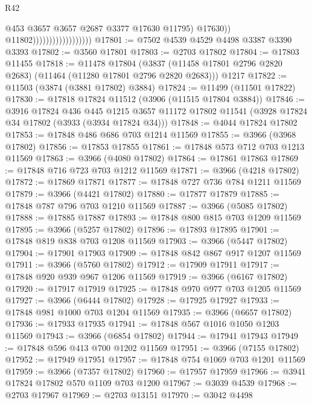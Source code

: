 \begin{lexlean}{R42}
\begin{coremodule}
                                              @453
                                              @3657
                                              @3657
                                              @2687
                                              @3377
                                              @17630
                                              @11795)
                                            @17630))
                                        @11802))))))))))))))))))
@17801 := @7502 @4539 @4529 @4498 @3387 @3390 @3393
@17802 := @3560 @17801
@17803 := @2703 @17802
@17804 := @17803 @11455
@17818 := @11478
    @17804
    (@3837 (@11458 @17801 @2796 @2820 @2683) (@11464 (@11280 @17801 @2796 @2820 @2683)))
    @1217
@17822 := @11503 (@3874 (@3881 @17802) @3884)
@17824 := @11499 (@11501 @17822)
@17830 := @17818 @17824 @11512 (@3906 (@11515 @17804 @3884))
@17846 := @3916
    @17824
    @436
    @445
    @1215
    @3657
    @11172
    @17802
    @11541
    (@3928 @17824 @34 @17802 (@3933 (@3934 @17824 @34)))
@17848 := @4044 @17824 @17802
@17853 := @17848 @486 @686 @703 @1214 @11569
@17855 := @3966 (@3968 @17802)
@17856 := @17853 @17855
@17861 := @17848 @573 @712 @703 @1213 @11569
@17863 := @3966 (@4080 @17802)
@17864 := @17861 @17863
@17869 := @17848 @716 @723 @703 @1212 @11569
@17871 := @3966 (@4218 @17802)
@17872 := @17869 @17871
@17877 := @17848 @727 @736 @784 @1211 @11569
@17879 := @3966 (@4421 @17802)
@17880 := @17877 @17879
@17885 := @17848 @787 @796 @703 @1210 @11569
@17887 := @3966 (@5085 @17802)
@17888 := @17885 @17887
@17893 := @17848 @800 @815 @703 @1209 @11569
@17895 := @3966 (@5257 @17802)
@17896 := @17893 @17895
@17901 := @17848 @819 @838 @703 @1208 @11569
@17903 := @3966 (@5447 @17802)
@17904 := @17901 @17903
@17909 := @17848 @842 @867 @917 @1207 @11569
@17911 := @3966 (@5760 @17802)
@17912 := @17909 @17911
@17917 := @17848 @920 @939 @967 @1206 @11569
@17919 := @3966 (@6167 @17802)
@17920 := @17917 @17919
@17925 := @17848 @970 @977 @703 @1205 @11569
@17927 := @3966 (@6444 @17802)
@17928 := @17925 @17927
@17933 := @17848 @981 @1000 @703 @1204 @11569
@17935 := @3966 (@6657 @17802)
@17936 := @17933 @17935
@17941 := @17848 @567 @1016 @1050 @1203 @11569
@17943 := @3966 (@6854 @17802)
@17944 := @17941 @17943
@17949 := @17848 @596 @413 @700 @1202 @11569
@17951 := @3966 (@7155 @17802)
@17952 := @17949 @17951
@17957 := @17848 @754 @1069 @703 @1201 @11569
@17959 := @3966 (@7357 @17802)
@17960 := @17957 @17959
@17966 := @3941 @17824 @17802 @570 @1109 @703 @1200
@17967 := @3039 @4539
@17968 := @2703 @17967
@17969 := @2703 @13151
@17970 := @3042 @4498

\end{coremodule}
\end{lexlean}
